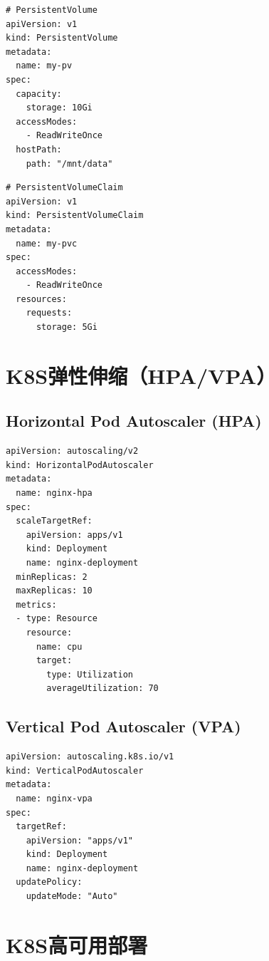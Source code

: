 \documentclass[12pt,UTF8]{ctexbook}
\begin{document}
\begin{lstlisting}
# PersistentVolume
apiVersion: v1
kind: PersistentVolume
metadata:
  name: my-pv
spec:
  capacity:
    storage: 10Gi
  accessModes:
    - ReadWriteOnce
  hostPath:
    path: "/mnt/data"
\end{lstlisting}

\begin{lstlisting}
# PersistentVolumeClaim
apiVersion: v1
kind: PersistentVolumeClaim
metadata:
  name: my-pvc
spec:
  accessModes:
    - ReadWriteOnce
  resources:
    requests:
      storage: 5Gi
\end{lstlisting}

\section{K8S弹性伸缩（HPA/VPA）}
\label{sec:k8s-autoscaling}

\subsection{Horizontal Pod Autoscaler (HPA)}

\begin{lstlisting}
apiVersion: autoscaling/v2
kind: HorizontalPodAutoscaler
metadata:
  name: nginx-hpa
spec:
  scaleTargetRef:
    apiVersion: apps/v1
    kind: Deployment
    name: nginx-deployment
  minReplicas: 2
  maxReplicas: 10
  metrics:
  - type: Resource
    resource:
      name: cpu
      target:
        type: Utilization
        averageUtilization: 70
\end{lstlisting}

\subsection{Vertical Pod Autoscaler (VPA)}

\begin{lstlisting}
apiVersion: autoscaling.k8s.io/v1
kind: VerticalPodAutoscaler
metadata:
  name: nginx-vpa
spec:
  targetRef:
    apiVersion: "apps/v1"
    kind: Deployment
    name: nginx-deployment
  updatePolicy:
    updateMode: "Auto"
\end{lstlisting}

\section{K8S高可用部署}
\label{sec:k8s-ha}
\end{document}
